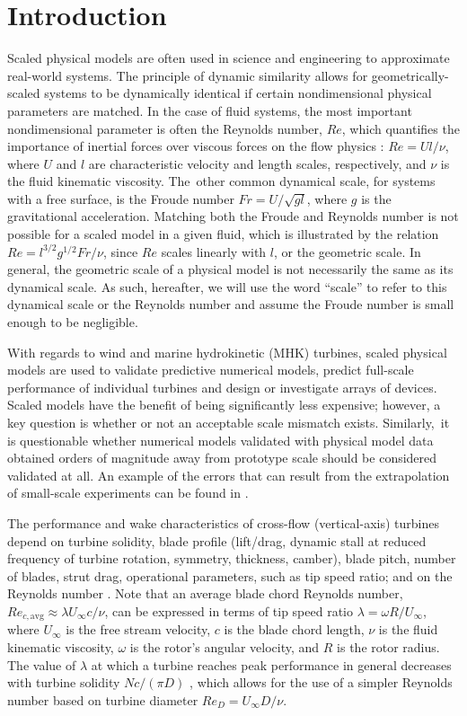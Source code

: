 \documentclass[energies,article,accept,moreauthors,pdftex,10pt,a4paper]{mdpi}
\theoremstyle{mdpi}
\newcounter{ex}
\newcounter{re}
\begin{document}
\section{Introduction}

Scaled physical models are often used in science and engineering to approximate
real-world systems. The principle of dynamic similarity allows for
geometrically-scaled systems to be dynamically identical if certain
nondimensional physical parameters are matched. In the case of fluid systems,
the most important nondimensional parameter is often the Reynolds number, $Re$,
which quantifies the importance of inertial forces over viscous forces on the
flow physics \cite{Acheson1990}: $Re = Ul/\nu$, where $U$ and $l$ are
characteristic velocity and length scales, respectively, and $\nu$ is the fluid
kinematic viscosity. The~other common dynamical scale, for systems with a free
surface, is the Froude number $Fr = U/\sqrt{gl}$, where $g$ is the gravitational
acceleration. Matching both the Froude and Reynolds number is not possible for a
scaled model in a given fluid, which is illustrated by the relation $Re =
l^{3/2} g^{1/2} Fr / \nu$, since $Re$ scales linearly with $l$, or the geometric
scale. In general, the geometric scale of a physical model is not necessarily
the same as its dynamical scale. As such, hereafter, we will use the word
``scale'' to refer to this dynamical scale or the Reynolds number and assume the
Froude number is small enough to be negligible.

With regards to wind and marine hydrokinetic (MHK) turbines, scaled physical
models are used to validate predictive numerical models, predict full-scale
performance of individual turbines and design or investigate arrays of devices.
Scaled models have the benefit of being significantly less expensive; however, a
key question is whether or not an acceptable scale mismatch exists.
Similarly,~it is questionable whether numerical models validated with physical
model data obtained orders of magnitude away from prototype scale should be
considered validated at all. An example of the errors that can result from the
extrapolation of small-scale experiments can be found in \cite{Baker1991}.

The performance and wake characteristics of cross-flow (vertical-axis) turbines
depend on turbine solidity, blade profile (lift/drag, dynamic stall at reduced
frequency of turbine rotation, symmetry, thickness, camber), blade pitch, number
of blades, strut drag, operational parameters, such as tip speed ratio; and on
the Reynolds number \cite{Para2002}. Note that an average blade chord Reynolds
number, $Re_{c,\mathrm{avg}} \approx \lambda U_\infty c/ \nu$, can be expressed
in terms of tip speed ratio $\lambda = \omega R/ U_\infty$, where $U_\infty$ is
the free stream velocity, $c$ is the blade chord length, $\nu$ is the fluid
kinematic viscosity, $\omega$ is the rotor's angular velocity, and $R$ is the
rotor radius. The value of $\lambda$ at which a turbine reaches peak performance
in general decreases with turbine solidity $Nc/(\pi D)$ \cite{Templin1974},
which allows for the use of a simpler Reynolds number based on turbine diameter
$Re_D = U_\infty D/\nu$.
\end{document}
